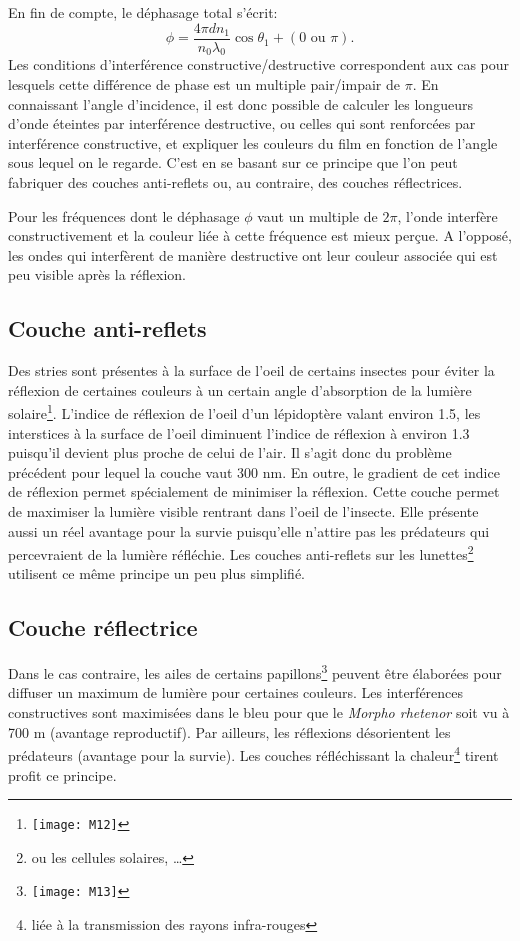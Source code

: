 En fin de compte, le déphasage total s'écrit:
$$\phi=\frac{4\pi dn_1}{n_0\lambda_0 }\cos \theta_1+(0\mbox{ ou }\pi).$$
Les conditions d'interférence constructive/destructive correspondent aux cas pour lesquels cette différence de phase est un multiple pair/impair de $\pi$. En connaissant l'angle d'incidence, il est donc possible de calculer les longueurs d'onde éteintes par interférence destructive, ou celles qui sont renforcées par interférence constructive, et expliquer les couleurs du film en fonction de l'angle sous lequel on le regarde. C'est en se basant sur ce principe que l'on peut
fabriquer des couches anti-reflets ou, au contraire, des couches réflectrices.

Pour les fréquences dont le déphasage $\phi$ vaut un multiple de $2\pi$, l'onde interfère constructivement et la couleur liée à cette fréquence est mieux perçue. A l'opposé, les ondes qui interfèrent de manière destructive ont leur couleur associée qui est peu visible après la réflexion.

\subsection{Couche anti-reflets}

Des stries sont présentes à la surface de l'oeil de certains insectes pour éviter la réflexion de certaines couleurs à un certain angle d'absorption de la lumière solaire\footnote{\texttt{[image: M12]}}. L'indice de réflexion de l'oeil d'un lépidoptère valant environ 1.5, les interstices à la surface de l'oeil diminuent l'indice de réflexion à environ 1.3 puisqu'il devient plus proche de celui de l'air. Il s'agit donc du problème précédent pour lequel la couche vaut 300 nm. En outre, le gradient de cet indice de réflexion permet spécialement de minimiser la réflexion. Cette couche permet de maximiser la lumière visible rentrant dans l'oeil de l'insecte. Elle présente aussi un réel avantage pour la survie puisqu'elle n'attire pas les prédateurs qui percevraient de la lumière réfléchie. Les couches anti-reflets sur les lunettes\footnote{ou les cellules solaires, \dots} utilisent ce même principe un peu plus simplifié.
\newpage

\subsection{Couche réflectrice}

Dans le cas contraire, les ailes de certains papillons\footnote{\texttt{[image: M13]}} peuvent être élaborées pour diffuser un maximum de lumière pour certaines couleurs. Les interférences constructives sont maximisées dans le bleu pour que le \textit{Morpho rhetenor} soit vu à 700 m (avantage reproductif).	Par ailleurs, les réflexions désorientent les prédateurs (avantage pour la survie). Les couches réfléchissant la chaleur\footnote{liée à la transmission des rayons infra-rouges} tirent profit ce principe.


